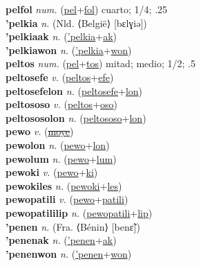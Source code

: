 \textbf{pelfol} \textit{num.} (\hyperref[pel]{pel}+\hyperref[fol]{fol})
cuarto; 1/4; .25 \label{pelfol} \\
\textbf{'pelkia} \textit{n.} (Nld. ⟨België⟩ [bɛlɣiə])
 \label{'pelkia} \\
\textbf{'pelkiaak} \textit{n.} (\hyperref['pelkia]{'pelkia}+\hyperref[ak]{ak})
 \label{'pelkiaak} \\
\textbf{'pelkiawon} \textit{n.} (\hyperref['pelkia]{'pelkia}+\hyperref[won]{won})
 \label{'pelkiawon} \\
\textbf{peltos} \textit{num.} (\hyperref[pel]{pel}+\hyperref[tos]{tos})
mitad; medio; 1/2; .5 \label{peltos} \\
\textbf{peltosefe} \textit{v.} (\hyperref[peltos]{peltos}+\hyperref[efe]{efe})
 \label{peltosefe} \\
\textbf{peltosefelon} \textit{n.} (\hyperref[peltosefe]{peltosefe}+\hyperref[lon]{lon})
 \label{peltosefelon} \\
\textbf{peltososo} \textit{v.} (\hyperref[peltos]{peltos}+\hyperref[oso]{oso})
 \label{peltososo} \\
\textbf{peltososolon} \textit{n.} (\hyperref[peltososo]{peltososo}+\hyperref[lon]{lon})
 \label{peltososolon} \\
\textbf{pewo} \textit{v.} (\hyperref[moye]{\sout{moye}})
 \label{pewo} \\
\textbf{pewolon} \textit{n.} (\hyperref[pewo]{pewo}+\hyperref[lon]{lon})
 \label{pewolon} \\
\textbf{pewolum} \textit{n.} (\hyperref[pewo]{pewo}+\hyperref[lum]{lum})
 \label{pewolum} \\
\textbf{pewoki} \textit{v.} (\hyperref[pewo]{pewo}+\hyperref[ki]{ki})
 \label{pewoki} \\
\textbf{pewokiles} \textit{n.} (\hyperref[pewoki]{pewoki}+\hyperref[les]{les})
 \label{pewokiles} \\
\textbf{pewopatili} \textit{v.} (\hyperref[pewo]{pewo}+\hyperref[patili]{patili})
 \label{pewopatili} \\
\textbf{pewopatililip} \textit{n.} (\hyperref[pewopatili]{pewopatili}+\hyperref[lip]{lip})
 \label{pewopatililip} \\
\textbf{'penen} \textit{n.} (Fra. ⟨Bénin⟩ [benɛ̃])
 \label{'penen} \\
\textbf{'penenak} \textit{n.} (\hyperref['penen]{'penen}+\hyperref[ak]{ak})
 \label{'penenak} \\
\textbf{'penenwon} \textit{n.} (\hyperref['penen]{'penen}+\hyperref[won]{won})
 \label{'penenwon} \\
